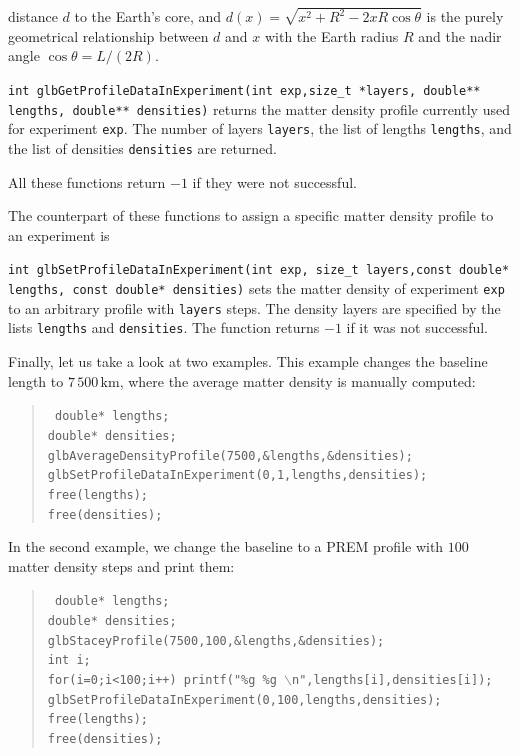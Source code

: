 distance $d$ to the Earth's core, and $d(x)=\sqrt{x^2+R^2-2 x R \cos \theta }$ is the purely geometrical relationship between $d$ and $x$ with the
Earth radius $R$ and the nadir angle $\cos \theta = L/(2 R)$.
\begin{function}
{\tt int glbGetProfileDataInExperiment(int exp,size\_t *layers, double** lengths, double** densities)} returns the matter density profile 
currently used for experiment {\tt exp}. The number of layers {\tt layers}, the list of lengths {\tt lengths}, and the list of densities {\tt densities} are returned.
\end{function}
All these functions return $-1$ if they were not successful.

The counterpart of these functions to assign a specific matter density
profile to an experiment is
\begin{function}
{\tt int glbSetProfileDataInExperiment(int exp, size\_t layers,const double* lengths, const double* densities)} sets the matter density of experiment
{\tt exp} to an arbitrary profile with {\tt layers} steps. The density
layers are specified by the lists {\tt lengths} and {\tt densities}.
The function returns $-1$ if it was not successful.
\end{function}

Finally, let us take a look at two examples. This example changes
the baseline length to $7\,500 \, \mathrm{km}$, where the average 
matter density is manually computed:
\begin{quote}
{\tt  
  double* lengths; \\
  double* densities; \\
  glbAverageDensityProfile(7500,\&lengths,\&densities); \\
  glbSetProfileDataInExperiment(0,1,lengths,densities); \\
  free(lengths); \\
  free(densities); \\
}
\end{quote}
In the second example, we change the baseline to a PREM profile with
$100$ matter density steps and print them:
\begin{quote}
{\tt
  double* lengths; \\
  double* densities; \\
  glbStaceyProfile(7500,100,\&lengths,\&densities); \\
  int i; \\
  for(i=0;i<100;i++) printf("\%g \%g $\backslash$n",lengths[i],densities[i]); \\
  glbSetProfileDataInExperiment(0,100,lengths,densities); \\
  free(lengths);\\
  free(densities);\\
}
\end{quote}

